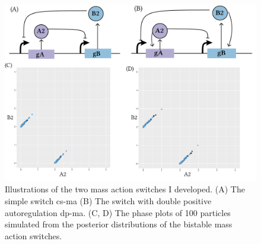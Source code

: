 \begin{figure}[htbp]
\begin{center}
\includegraphics[scale=0.7]{../../chapters/chapterStabilityFinder/images/MA-cs-dp-phase.png}
\caption[The mass action toggle switches and phase plots]{ \label{fig:ma-cs-dp-phase} Illustrations of the two mass action switches I developed. (A) The simple switch \acrshort{cs-ma} (B) The switch with double positive autoregulation \acrshort{dp-ma}. (C, D) The phase plots of 100 particles simulated from the posterior distributions of the bistable mass action switches.}
\end{center}
\end{figure}


